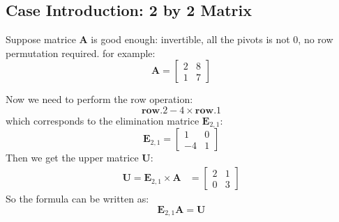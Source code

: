     \subsection{Case Introduction: 2 by 2 Matrix}
        Suppose matrice \textbf{A} is good enough: invertible, all the pivots is not 0, no row permutation required.
        for example:
            \begin{equation}
                \mathbf{A} =
                \begin{bmatrix}
                    2 & 8\\
                    1 & 7
                \end{bmatrix}
            \end{equation}
        
        Now we need to perform the row operation:
            \begin{equation}
                \mathbf{row.2} - 4 \times \mathbf{row.1}
            \end{equation}
        which corresponds to the elimination matrice $\mathbf{E}_{2,1}$:
            \begin{equation}
                \mathbf{E}_{2,1} = 
                \begin{bmatrix}
                    1 & 0 \\
                    \boxed{-4} & 1
                \end{bmatrix}
            \end{equation}
        Then we get the upper matrice \textbf{U}:
            \begin{equation}
                \begin{aligned}
                    \mathbf{U} = 
                    \mathbf{E}_{2,1} \times \mathbf{A}
                    & = 
                    \begin{bmatrix}
                        2 & 1\\
                        0 & 3
                    \end{bmatrix}
                \end{aligned}       
            \end{equation}
        So the formula can be written as:
            \begin{equation}
                \mathbf{E}_{2,1} \mathbf{A} = \mathbf{U}
            \end{equation}
        
